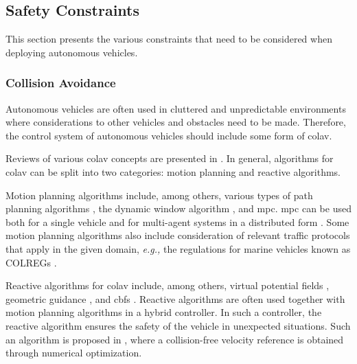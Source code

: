 \subsection{Safety Constraints}

This section presents the various constraints that need to be considered when deploying autonomous vehicles.

\subsubsection{Collision Avoidance}
Autonomous vehicles are often used in cluttered and unpredictable environments where considerations to other vehicles and obstacles need to be made. 
Therefore, the control system of autonomous vehicles should include some form of \gls{colav}.

Reviews of various \gls{colav} concepts are presented in \cite{statheros_autonomous_2008,tam_review_2009,hoy_algorithms_2015}.
In general, algorithms for \gls{colav} can be split into two categories: motion planning and reactive algorithms.

Motion planning algorithms include, among others, various types of path planning algorithms \cite{wang_ship_2017,kuwata_safe_2014,chiang_colreg-rrt_2018,lazarowska_ships_2015}, the dynamic window algorithm \cite{fox_dynamic_1997}, and \gls{mpc}.
\gls{mpc} can be used both for a single vehicle \cite{hagen_mpc-based_2018,sun_collision_2018} and for multi-agent systems in a distributed form \cite{kuriki_formation_2015,dai_distributed_2017}.
Some motion planning algorithms also include consideration of relevant traffic protocols that apply in the given domain, \emph{e.g.,} the regulations for marine vehicles known as COLREGs \cite{wang_ship_2017,kuwata_safe_2014,chiang_colreg-rrt_2018}.

Reactive algorithms for \gls{colav} include, among others, virtual potential fields \cite{roussos_3d_2008}, geometric guidance \cite{mujumdar_reactive_2011}, and \glspl{cbf} \cite{squires_constructive_2018,igarashi_collision_2018,romdlony_stabilization_2016,basso_safety-critical_2020,ames_control_2014}.
Reactive algorithms are often used together with motion planning algorithms in a hybrid controller.
In such a controller, the reactive algorithm ensures the safety of the vehicle in unexpected situations.
Such an algorithm is proposed in \cite{hedjar_automatic_2019}, where a collision-free velocity reference is obtained through numerical optimization.

